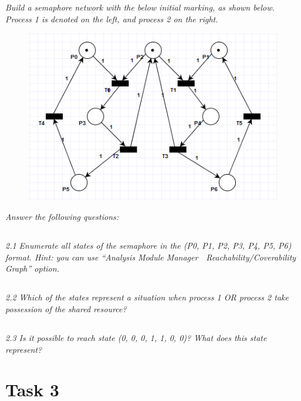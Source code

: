 \documentclass[letterpaper]{article}
\begin{document}
\textit{Build a semaphore network with the below initial marking, as shown below. Process 1 is denoted on the left, and process 2 on the right.
}
\begin{figure}[H]
 \centering
 \includegraphics[width=\textwidth]{image3.png}
\end{figure}

\textit{Answer the following questions:}

\subsection{}
\textit{2.1  Enumerate all states of the semaphore in the (P0, P1, P2, P3, P4, P5, P6) format.
 Hint: you can use “Analysis Module Manager  Reachability/Coverability Graph” option.
}

\subsection{}
\textit{2.2  Which of the states represent a situation when process 1 OR process 2 take possession of the shared resource?}

\subsection{}
\textit{2.3  Is it possible to reach state (0, 0, 0, 1, 1, 0, 0)? What does this state represent?}

\section{Task 3}
\end{document}
